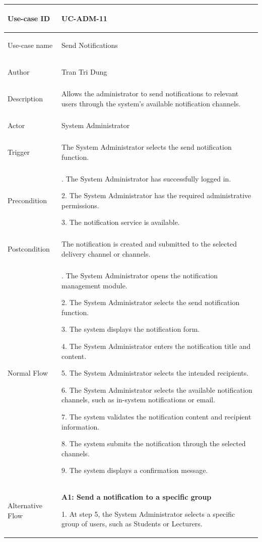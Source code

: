 \begin{longtable}{|>{\bfseries\raggedright\arraybackslash}p{}|>{\raggedright\arraybackslash}p{}|}
\hline
Use-case ID & UC-ADM-11 \\ \hline
Use-case name & Send Notifications \\ \hline
Author & Tran Tri Dung \\ \hline
Description & Allows the administrator to send notifications to relevant users through the system's available notification channels. \\ \hline
Actor & System Administrator \\ \hline
Trigger & The System Administrator selects the send notification function. \\ \hline
Precondition &
1. The System Administrator has successfully logged in. \par
2. The System Administrator has the required administrative permissions. \par
3. The notification service is available. \\ \hline
Postcondition & The notification is created and submitted to the selected delivery channel or channels. \\ \hline
Normal Flow &
1. The System Administrator opens the notification management module. \par
2. The System Administrator selects the send notification function. \par
3. The system displays the notification form. \par
4. The System Administrator enters the notification title and content. \par
5. The System Administrator selects the intended recipients. \par
6. The System Administrator selects the available notification channels, such as in-system notifications or email. \par
7. The system validates the notification content and recipient information. \par
8. The system submits the notification through the selected channels. \par
9. The system displays a confirmation message. \\ \hline
Alternative Flow &
\textbf{A1: Send a notification to a specific group} \par
1. At step 5, the System Administrator selects a specific group of users, such as Students or Lecturers. \par

\end{longtable}

